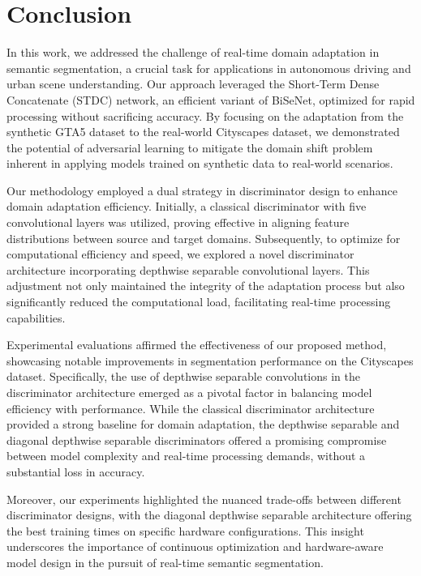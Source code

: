 \documentclass[conference]{IEEEtran}
\begin{document}
\section{Conclusion}

In this work, we addressed the challenge of real-time domain adaptation in semantic segmentation, a crucial task for applications in autonomous driving and urban scene understanding. Our approach leveraged the Short-Term Dense Concatenate (STDC) network, an efficient variant of BiSeNet, optimized for rapid processing without sacrificing accuracy. By focusing on the adaptation from the synthetic GTA5 dataset to the real-world Cityscapes dataset, we demonstrated the potential of adversarial learning to mitigate the domain shift problem inherent in applying models trained on synthetic data to real-world scenarios.

Our methodology employed a dual strategy in discriminator design to enhance domain adaptation efficiency. Initially, a classical discriminator with five convolutional layers was utilized, proving effective in aligning feature distributions between source and target domains. Subsequently, to optimize for computational efficiency and speed, we explored a novel discriminator architecture incorporating depthwise separable convolutional layers. This adjustment not only maintained the integrity of the adaptation process but also significantly reduced the computational load, facilitating real-time processing capabilities.

Experimental evaluations affirmed the effectiveness of our proposed method, showcasing notable improvements in segmentation performance on the Cityscapes dataset. Specifically, the use of depthwise separable convolutions in the discriminator architecture emerged as a pivotal factor in balancing model efficiency with performance. While the classical discriminator architecture provided a strong baseline for domain adaptation, the depthwise separable and diagonal depthwise separable discriminators offered a promising compromise between model complexity and real-time processing demands, without a substantial loss in accuracy.

Moreover, our experiments highlighted the nuanced trade-offs between different discriminator designs, with the diagonal depthwise separable architecture offering the best training times on specific hardware configurations. This insight underscores the importance of continuous optimization and hardware-aware model design in the pursuit of real-time semantic segmentation.
\end{document}
